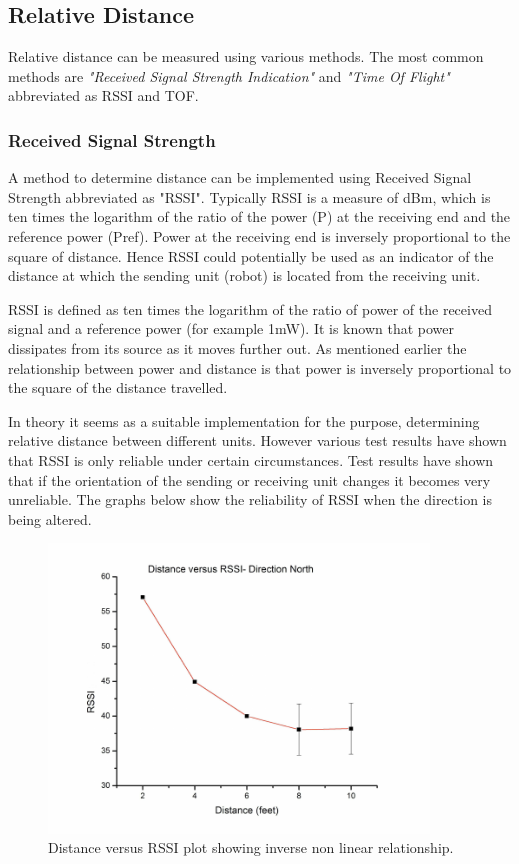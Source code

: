 \documentclass[10pt,a4paper]{article}
\begin{document}
\subsection{Relative Distance}
Relative distance can be measured using various methods. The most common methods are \textit{"Received Signal Strength Indication"} and \textit{"Time Of Flight"} abbreviated as RSSI and TOF. 

\subsubsection{Received Signal Strength}
A method to determine distance can be implemented using Received Signal Strength abbreviated as "RSSI". Typically RSSI is a measure of dBm, which is ten times the logarithm of the ratio of the power (P)
at the receiving end and the reference power (Pref). Power at the receiving end is inversely proportional to the
square of distance.\cite{RSSI} Hence RSSI could potentially be used as an indicator of the distance
at which the sending unit (robot) is located from the receiving unit.\cite{RSSI}

RSSI is defined as ten times the logarithm of the ratio of power of the received signal
and a reference power (for example 1mW). It is known that power dissipates from its source
as it moves further out. As mentioned earlier the relationship between power and distance is that power is inversely
proportional to the square of the distance travelled. \cite{RSSI}

In theory it seems as a suitable implementation for the purpose, determining relative distance between
different units. However various test results have shown that RSSI is only reliable under certain circumstances.
Test results have shown that if the orientation of the sending or receiving unit changes it becomes very unreliable.
The graphs below show the reliability of RSSI when the direction is being altered.\cite{RSSI}

\begin{figure}[H]
\centering
\includegraphics[width=0.9\textwidth]{North.pdf}
\caption{Distance versus RSSI plot showing inverse non linear
relationship.\cite{RSSI}}
\label{North}
\end{figure}
\end{document}
